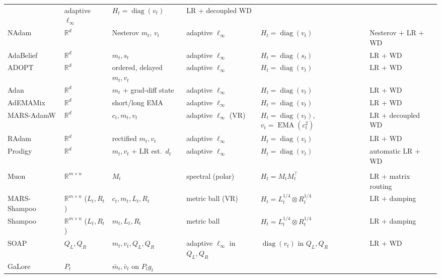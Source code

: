 \begin{table}[htbp]
\begin{tabularx}{\textwidth}{
  @{}
  p{}
  p{}
  Y 
  Y 
  Y 
  Y
  @{}}
      & adaptive $\ell_\infty$ & $H_t=\operatorname{diag}(v_t)$
      & LR + decoupled WD \\
    NAdam
      & $\mathbb{R}^d$ & Nesterov $m_t$, $v_t$
      & adaptive $\ell_\infty$ & $H_t=\operatorname{diag}(v_t)$
      & Nesterov + LR + WD \\
    AdaBelief
      & $\mathbb{R}^d$ & $m_t,s_t$
      & adaptive $\ell_\infty$ & $H_t=\operatorname{diag}(s_t)$
      & LR + WD \\
    ADOPT
      & $\mathbb{R}^d$ & ordered, delayed $m_t,v_t$
      & adaptive $\ell_\infty$ & $H_t=\operatorname{diag}(v_t)$
      & LR + WD \\
    Adan
      & $\mathbb{R}^d$ & $m_t$ + grad-diff state
      & adaptive $\ell_\infty$ & $H_t=\operatorname{diag}(v_t)$
      & LR + WD \\
    AdEMAMix
      & $\mathbb{R}^d$ & short/long EMA
      & adaptive $\ell_\infty$ & $H_t=\operatorname{diag}(v_t)$
      & LR + WD \\
    MARS-AdamW
      & $\mathbb{R}^d$ & $c_t,m_t,v_t$
      & adaptive $\ell_\infty$ (VR)
      & $H_t=\operatorname{diag}(v_t)$, $v_t=\operatorname{EMA}(c_t^2)$
      & LR + decoupled WD \\
    RAdam
      & $\mathbb{R}^d$ & rectified $m_t,v_t$
      & adaptive $\ell_\infty$ & $H_t=\operatorname{diag}(v_t)$
      & LR + WD \\
    Prodigy
      & $\mathbb{R}^d$ & $m_t,v_t$ + LR est.\ $d_t$
      & adaptive $\ell_\infty$ & $H_t=\operatorname{diag}(v_t)$
      & automatic LR + WD \\
    \midrule
     \\
    Muon
      & $\mathbb{R}^{m\times n}$ & $M_t$
      & spectral (polar) & $H_t=M_t M_t^\top$
      & LR + matrix routing \\
    MARS-Shampoo
      & $\mathbb{R}^{m\times n}$ ($L_t,R_t$) & $c_t,m_t,L_t,R_t$
      & metric ball (VR) & $H_t=L_t^{1/4}\!\otimes\!R_t^{1/4}$
      & LR + damping \\
    Shampoo
      & $\mathbb{R}^{m\times n}$ ($L_t,R_t$) & $m_t,L_t,R_t$
      & metric ball & $H_t=L_t^{1/4}\!\otimes\!R_t^{1/4}$
      & LR + damping \\
    SOAP
      & $Q_L,Q_R$ & $m_t,v_t,Q_L,Q_R$
      & adaptive $\ell_\infty$ in $Q_L,Q_R$
      & $\operatorname{diag}(v_t)$ in $Q_L,Q_R$ & LR + WD \\
    GaLore
      & $P_t$ & $\bar{m}_t,\bar{v}_t$ on $P_t g_t$

\end{tabularx}
\end{table}
